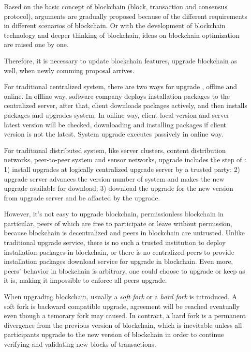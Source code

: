 \documentclass[sigplan,screen]{acmart}
\begin{document}
Based on the basic concept of blockchain (block, transaction and consensus
protocol), arguments are gradually proposed because of the different
requirements in different scenarios of blockchain.
Or with the development of blockchain technology and deeper thinking of
blockchain, ideas on blockchain optimization are raised one by one.

Therefore, it is necessary to update blockchain features, upgrade blockchain as
well, when newly comming proposal arrives.

For traditional centralized system, there are two ways for upgrade
\cite{softwareupgradewikidef}, offline and online.
In offline way, software company deploys installation packages to the
centralized server, after that, client downloads packages actively, and then
installs packages and upgrades system. In online way, client local version and
server latest version will be checked, downloading and installing packages if
client version is not the latest. System upgrade executes passively in online
way.

For traditional distributed system, like server clusters,
content distribution networks, peer-to-peer system and sensor networks,
upgrade includes the step of \cite{ajmani2003scheduling}:
1) install upgrades at logically centralized
upgrade server by a trusted party; 2) upgrade server advances the version
number of system and makes the new upgrade available for download; 3) download
the upgrade for the new version from upgrade server and be affacted by the
upgrade.

However, it's not easy to upgrade blockchain, permissionless blockchain in
particular, peers of which are free to participate or leave without permission,
because blockchain is decentralized and peers in blockchain are untrusted.
Unlike traditional upgrade service, there is no such a trusted institution to
deploy installation packages in blockchain, or there is no centralized peers to
provide installation packages download service for upgrade in blockchain.
Even more, peers' behavior in blockchain is arbitrary, one could choose to
upgrade or keep as it is, making it impossible to enforce all peers upgrade.

When upgrading blockchain, usually a \textit{soft fork} or a \textit{hard fork}
is introduced. A soft fork is backward compatible upgrade,
agreement will be reached eventually even though a temorary fork may caused.
In contract, a hard fork is a permanent divergence from the previous version of
blockchain, which is inevitable unless all participants upgrade to the new
version of blockchain in order to continue verifying and validating new blocks
of transactions.
\end{document}
